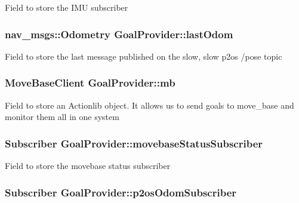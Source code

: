 \-Field to store the \-I\-M\-U subscriber \hypertarget{classGoalProvider_a35676425f3d7bfcaa409554879d7b3b8}{
\subsubsection[{last\-Odom}]{\setlength{\rightskip}{0pt plus 5cm}nav\-\_\-msgs\-::\-Odometry {\bf \-Goal\-Provider\-::last\-Odom}}}\label{classGoalProvider_a35676425f3d7bfcaa409554879d7b3b8}
\-Field to store the last message published on the slow, slow p2os /pose topic \hypertarget{classGoalProvider_a903cb379ce27ab3072fc273f8d344b0b}{
\subsubsection[{mb}]{\setlength{\rightskip}{0pt plus 5cm}\-Move\-Base\-Client {\bf \-Goal\-Provider\-::mb}}}\label{classGoalProvider_a903cb379ce27ab3072fc273f8d344b0b}
\-Field to store an \-Actionlib object. \-It allows us to send goals to move\-\_\-base and monitor them all in one system \hypertarget{classGoalProvider_a16a3122fd49b058c08a56e8eac93c08b}{
\subsubsection[{movebase\-Status\-Subscriber}]{\setlength{\rightskip}{0pt plus 5cm}\-Subscriber {\bf \-Goal\-Provider\-::movebase\-Status\-Subscriber}}}\label{classGoalProvider_a16a3122fd49b058c08a56e8eac93c08b}
\-Field to store the movebase status subscriber \hypertarget{classGoalProvider_a5f5494e3cd35116f170082bce82201e5}{
\subsubsection[{p2os\-Odom\-Subscriber}]{\setlength{\rightskip}{0pt plus 5cm}\-Subscriber {\bf \-Goal\-Provider\-::p2os\-Odom\-Subscriber}}}\label{classGoalProvider_a5f5494e3cd35116f170082bce82201e5}
